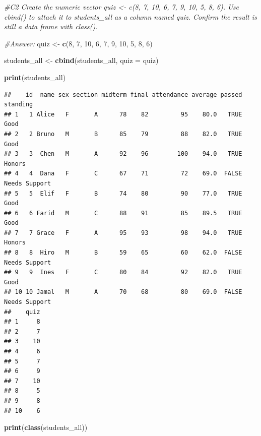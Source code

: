 \documentclass[
]{article}
\newenvironment{Shaded}{\begin{snugshade}}{\end{snugshade}}
\newcommand{\AttributeTok}[1]{\textcolor[rgb]{0.13,0.29,0.53}{#1}}
\newcommand{\CommentTok}[1]{\textcolor[rgb]{0.56,0.35,0.01}{\textit{#1}}}
\newcommand{\DecValTok}[1]{\textcolor[rgb]{0.00,0.00,0.81}{#1}}
\newcommand{\FunctionTok}[1]{\textcolor[rgb]{0.13,0.29,0.53}{\textbf{#1}}}
\newcommand{\NormalTok}[1]{#1}
\newcommand{\OtherTok}[1]{\textcolor[rgb]{0.56,0.35,0.01}{#1}}
\begin{document}
\begin{Shaded}
\begin{Highlighting}[]
\CommentTok{\#C2 Create the numeric vector quiz \textless{}{-} c(8, 7, 10, 6, 7, 9, 10, 5, 8, 6). Use cbind() to attach it to students\_all as a column named quiz. Confirm the result is still a data frame with class().}

\CommentTok{\#Answer:}
\NormalTok{quiz }\OtherTok{\textless{}{-}} \FunctionTok{c}\NormalTok{(}\DecValTok{8}\NormalTok{, }\DecValTok{7}\NormalTok{, }\DecValTok{10}\NormalTok{, }\DecValTok{6}\NormalTok{, }\DecValTok{7}\NormalTok{, }\DecValTok{9}\NormalTok{, }\DecValTok{10}\NormalTok{, }\DecValTok{5}\NormalTok{, }\DecValTok{8}\NormalTok{, }\DecValTok{6}\NormalTok{)}

\NormalTok{students\_all }\OtherTok{\textless{}{-}} \FunctionTok{cbind}\NormalTok{(students\_all, }\AttributeTok{quiz =}\NormalTok{ quiz)}

\FunctionTok{print}\NormalTok{(students\_all)}
\end{Highlighting}
\end{Shaded}

\begin{verbatim}
##    id  name sex section midterm final attendance average passed      standing
## 1   1 Alice   F       A      78    82         95    80.0   TRUE          Good
## 2   2 Bruno   M       B      85    79         88    82.0   TRUE          Good
## 3   3  Chen   M       A      92    96        100    94.0   TRUE        Honors
## 4   4  Dana   F       C      67    71         72    69.0  FALSE Needs Support
## 5   5  Elif   F       B      74    80         90    77.0   TRUE          Good
## 6   6 Farid   M       C      88    91         85    89.5   TRUE          Good
## 7   7 Grace   F       A      95    93         98    94.0   TRUE        Honors
## 8   8  Hiro   M       B      59    65         60    62.0  FALSE Needs Support
## 9   9  Ines   F       C      80    84         92    82.0   TRUE          Good
## 10 10 Jamal   M       A      70    68         80    69.0  FALSE Needs Support
##    quiz
## 1     8
## 2     7
## 3    10
## 4     6
## 5     7
## 6     9
## 7    10
## 8     5
## 9     8
## 10    6
\end{verbatim}

\begin{Shaded}
\begin{Highlighting}[]
\FunctionTok{print}\NormalTok{(}\FunctionTok{class}\NormalTok{(students\_all))}
\end{Highlighting}
\end{Shaded}
\end{document}
